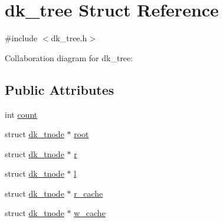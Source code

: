 \hypertarget{structdk__tree}{\section{dk\+\_\+tree Struct Reference}
\label{structdk__tree}
}


{\ttfamily \#include $<$dk\+\_\+tree.\+h$>$}



Collaboration diagram for dk\+\_\+tree\+:
\subsection*{Public Attributes}
\begin{DoxyCompactItemize}
\item 
int \hyperlink{structdk__tree_af79ecba1677f82486893accb0859a696}{count}
\item 
struct \hyperlink{structdk__tnode}{dk\+\_\+tnode} $\ast$ \hyperlink{structdk__tree_a6a5c48e2ff2494e10aafd1d0bc9d5992}{root}
\item 
struct \hyperlink{structdk__tnode}{dk\+\_\+tnode} $\ast$ \hyperlink{structdk__tree_a5d989a0efeadbc970750f1ac8ad4018e}{r}
\item 
struct \hyperlink{structdk__tnode}{dk\+\_\+tnode} $\ast$ \hyperlink{structdk__tree_a47101f1a0d29f4be791707a4b4b6477e}{l}
\item 
struct \hyperlink{structdk__tnode}{dk\+\_\+tnode} $\ast$ \hyperlink{structdk__tree_ae1a363a68dda726e3010e6766057dbbe}{r\+\_\+cache}
\item 
struct \hyperlink{structdk__tnode}{dk\+\_\+tnode} $\ast$ \hyperlink{structdk__tree_ab968d09f4098a59419b509bce61debcb}{w\+\_\+cache}
\end{DoxyCompactItemize}


